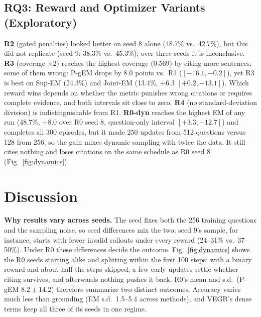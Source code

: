 \documentclass[conference]{IEEEtran}
\newcommand{\pgem}{P-gEM}
\begin{document}

\subsection{RQ3: Reward and Optimizer Variants (Exploratory)}
\textbf{R2} (gated penalties) looked better on seed 8 alone (48.7\% vs.\ 42.7\%), but this did not replicate (seed 9: 38.3\% vs.\ 45.3\%); over three seeds it is inconclusive. \textbf{R3} (coverage $\times$2) reaches the highest coverage (0.569) by citing more sentences, some of them wrong: \pgem{} drops by 8.0 points vs.\ R1 ($[-16.1,-0.2]$), yet R3 is best on Sup-EM (24.3\%) and Joint-EM (13.4\%, $+6.3$ $[+0.2,+13.1]$). Which reward wins depends on whether the metric punishes wrong citations or requires complete evidence, and both intervals sit close to zero. \textbf{R4} (no standard-deviation division) is indistinguishable from R1. \textbf{R0-dyn} reaches the highest EM of any run (48.7\%, $+8.0$ over R0 seed 8, question-only interval $[+3.3,+12.7]$) and completes all 300 episodes, but it made 250 updates from 512 questions versus 128 from 256, so the gain mixes dynamic sampling with twice the data. It still cites nothing and loses citations on the same schedule as R0 seed 8 (Fig.~\ref{fig:dynamics}).

\section{Discussion}
\label{sec:discussion}

\textbf{Why results vary across seeds.} The seed fixes both the 256 training questions and the sampling noise, so seed differences mix the two; seed 9's sample, for instance, starts with fewer invalid rollouts under every reward (24--31\% vs.\ 37--50\%). Under R0 these differences decide the outcome. Fig.~\ref{fig:dynamics} shows the R0 seeds starting alike and splitting within the first 100 steps: with a binary reward and about half the steps skipped, a few early updates settle whether citing survives, and afterwards nothing pushes it back. R0's mean and s.d.\ (\pgem{} $8.2\pm14.2$) therefore summarize two distinct outcomes. Accuracy varies much less than grounding (EM s.d.\ 1.5--5.4 across methods), and VEGR's dense terms keep all three of its seeds in one regime.
\end{document}

